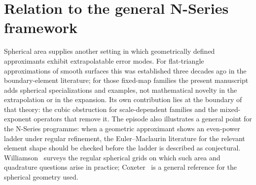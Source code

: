 \documentclass[11pt]{article}
\theoremstyle{remark}
\begin{document}
\section{Relation to the general N-Series framework}
Spherical area supplies another setting in which geometrically defined approximants exhibit
extrapolatable error modes. For flat-triangle approximations of smooth surfaces this was
established three decades ago in the boundary-element literature; for those fixed-map families the present manuscript adds spherical specializations and
examples, not mathematical novelty in the extrapolation or in the expansion. Its own
contribution lies at the boundary of that theory: the cubic obstruction for scale-dependent
families and the mixed-exponent operators that remove it. The episode also illustrates a general point for the N-Series programme: when a
geometric approximant shows an even-power ladder under regular refinement, the
Euler--Maclaurin literature for the relevant element shape should be checked before the
ladder is described as conjectural. Williamson~\cite{williamson} surveys the regular
spherical grids on which such area and quadrature questions arise in practice;
Coxeter~\cite{coxeter} is a general reference for the spherical geometry used.

\end{document}
